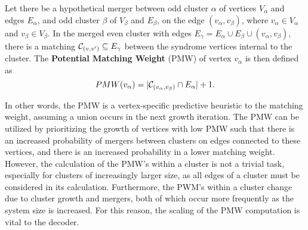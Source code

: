 \begin{definition}\label{def:pmw}
    Let there be a hypothetical merger between odd cluster $\alpha$ of vertices $V_\alpha$ and edges $E_\alpha$, and odd cluster $\beta$ of $V_\beta$ and $E_\beta$, on the edge $(v_\alpha, v_\beta)$, where $v_\alpha \in V_\alpha$ and $v_\beta \in V_\beta$. In the merged even cluster with edges $E_{\gamma} = E_\alpha \cup E_\beta \cup (v_\alpha, v_\beta)$, there is a matching $\mathcal{C}_{(v,v')} \subseteq E_{\gamma}$  between the syndrome vertices internal to the cluster. The \textbf{Potential Matching Weight} (PMW) of vertex $v_\alpha$ is then defined as
    \begin{equation}
      PMW(v_\alpha) = \lvert\mathcal{C}_{(v_\alpha,v_\beta)} \cap E_\alpha\rvert + 1.
    \end{equation}
\end{definition}

In other words, the PMW is a vertex-specific predictive heuristic to the matching weight, assuming a union occurs in the next growth iteration. The PMW can be utilized by prioritizing the growth of vertices with low PMW such that there is an increased probability of mergers between clusters on edges connected to these vertices, and there is an increased probability in a lower matching weight. However, the calculation of the PMW's within a cluster is not a trivial task, especially for clusters of increasingly larger size, as all edges of a cluster must be considered in its calculation. Furthermore, the PWM's within a cluster change due to cluster growth and mergers, both of which occur more frequently as the system size is increased. For this reason, the scaling of the PMW computation is vital to the decoder. 

